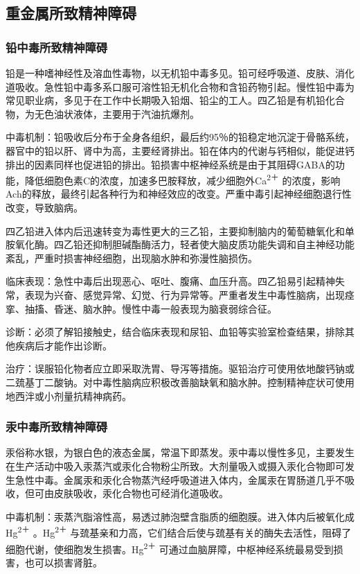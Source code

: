 \subsection{重金属所致精神障碍}

\subsubsection{铅中毒所致精神障碍}

铅是一种嗜神经性及溶血性毒物，以无机铅中毒多见。铅可经呼吸道、皮肤、消化道吸收。急性铅中毒多系口服可溶性铅无机化合物和含铅药物引起。慢性铅中毒为常见职业病，多见于在工作中长期吸入铅烟、铅尘的工人。四乙铅是有机铅化合物，为无色油状液体，主要用于汽油抗爆剂。

中毒机制：铅吸收后分布于全身各组织，最后约95％的铅稳定地沉淀于骨骼系统，器官中的铅以肝、肾中为高，主要经肾排出。铅在体内的代谢与钙相似，能促进钙排出的因素同样也促进铅的排出。铅损害中枢神经系统是由于其阻碍GABA的功能，降低细胞色素C的浓度，加速多巴胺释放，减少细胞外Ca\textsuperscript{2＋}
的浓度，影响Ach的释放，最终引起各种行为和神经效应的改变。严重中毒引起神经细胞退行性改变，导致脑病。

四乙铅进入体内后迅速转变为毒性更大的三乙铅，主要抑制脑内的葡萄糖氧化和单胺氧化酶。四乙铅还抑制胆碱酯酶活力，轻者使大脑皮质功能失调和自主神经功能紊乱，严重时损害神经细胞，出现脑水肿和弥漫性脑损伤。

临床表现：急性中毒后出现恶心、呕吐、腹痛、血压升高。四乙铅易引起精神失常，表现为兴奋、感觉异常、幻觉、行为异常等。严重者发生中毒性脑病，出现痉挛、抽搐、昏迷、脑水肿。慢性中毒一般表现为脑衰弱综合征。

诊断：必须了解铅接触史，结合临床表现和尿铅、血铅等实验室检查结果，排除其他疾病后才能作出诊断。

治疗：误服铅化物者应立即采取洗胃、导泻等措施。驱铅治疗可使用依地酸钙钠或二巯基丁二酸钠。对中毒性脑病应积极改善脑缺氧和脑水肿。控制精神症状可使用地西泮或小剂量抗精神病药。

\subsubsection{汞中毒所致精神障碍}

汞俗称水银，为银白色的液态金属，常温下即蒸发。汞中毒以慢性多见，主要发生在生产活动中吸入汞蒸汽或汞化合物粉尘所致。大剂量吸入或摄入汞化合物即可发生急性中毒。金属汞和汞化合物蒸汽经呼吸道进入体内，金属汞在胃肠道几乎不吸收，但可由皮肤吸收，汞化合物也可经消化道吸收。

中毒机制：汞蒸汽脂溶性高，易透过肺泡壁含脂质的细胞膜。进入体内后被氧化成Hg\textsuperscript{2＋}
。Hg\textsuperscript{2＋}
与巯基亲和力高，它们结合后使与巯基有关的酶失去活性，阻碍了细胞代谢，使细胞发生损害。Hg\textsuperscript{2＋}
可通过血脑屏障，中枢神经系统最易受到损害，也可以损害肾脏。

